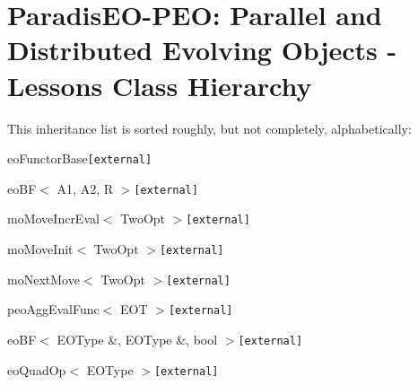 \section{Paradis\-EO-PEO: Parallel and Distributed Evolving Objects - Lessons Class Hierarchy}
This inheritance list is sorted roughly, but not completely, alphabetically:\begin{CompactList}
\item eo\-Functor\-Base{\tt  \mbox{[}external\mbox{]}}\begin{CompactList}
\item eo\-BF$<$ A1, A2, R $>${\tt  \mbox{[}external\mbox{]}}\begin{CompactList}
\item mo\-Move\-Incr\-Eval$<$ Two\-Opt $>${\tt  \mbox{[}external\mbox{]}}\begin{CompactList}
\item {}
\end{CompactList}
\item mo\-Move\-Init$<$ Two\-Opt $>${\tt  \mbox{[}external\mbox{]}}\begin{CompactList}
\item {}
\end{CompactList}
\item mo\-Next\-Move$<$ Two\-Opt $>${\tt  \mbox{[}external\mbox{]}}\begin{CompactList}
\item {}
\end{CompactList}
\item peo\-Agg\-Eval\-Func$<$ EOT $>${\tt  \mbox{[}external\mbox{]}}\begin{CompactList}
\item {}
\end{CompactList}
\end{CompactList}
\item eo\-BF$<$ EOType \&, EOType \&, bool $>${\tt  \mbox{[}external\mbox{]}}\begin{CompactList}
\item eo\-Quad\-Op$<$ EOType $>${\tt  \mbox{[}external\mbox{]}}\begin{CompactList}
\item {}
\item {}

\end{CompactList}
\end{CompactList}
\end{CompactList}
\end{CompactList}
